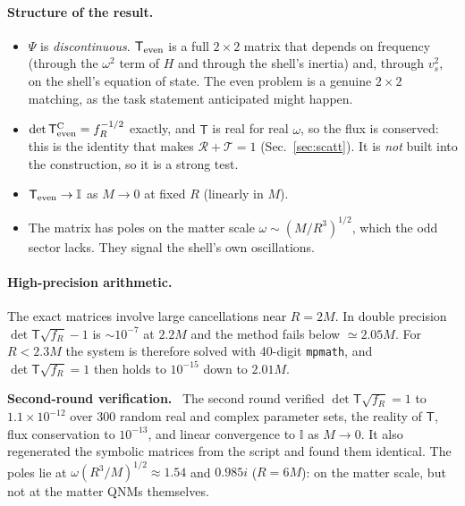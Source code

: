 \documentclass[11pt,a4paper]{article}
\numberwithin{equation}{section}
\newcommand{\sq}{\sqrt{f_R}}
\newcommand{\RR}{\mathcal R}
\newcommand{\TT}{\mathcal T}
\newenvironment{verifbox}{\par\medskip\begingroup\small\noindent{\color{orange!70!black}\rule{\linewidth}{0.8pt}}\par\nopagebreak\noindent\textbf{\color{orange!70!black}Second-round verification.}\ }%
  {\par\nopagebreak\noindent{\color{orange!70!black}\rule{\linewidth}{0.8pt}}\par\endgroup\medskip}
\begin{document}
\paragraph{Structure of the result.}
\begin{itemize}
\item $\Psi$ is \emph{discontinuous}. $\mathsf T_{\rm even}$ is a full $2\times2$ matrix that depends on frequency
(through the $\omega^2$ term of $H$ and through the shell's inertia) and, through $v_s^2$, on the shell's equation of
state. The even problem is a genuine $2\times2$ matching, as the task statement anticipated might happen.
\item $\det\mathsf T^{\rm C}_{\rm even}=f_R^{-1/2}$ exactly, and $\mathsf T$ is real for real $\omega$, so the flux is
conserved: this is the identity that makes $\RR+\TT=1$ (Sec.~\ref{sec:scatt}). It is \emph{not} built into the
construction, so it is a strong test.
\item $\mathsf T_{\rm even}\to\mathbb I$ as $M\to0$ at fixed $R$ (linearly in $M$).
\item The matrix has poles on the matter scale $\omega\sim(M/R^3)^{1/2}$, which the odd sector lacks. They signal
the shell's own oscillations.
\end{itemize}
\paragraph{High-precision arithmetic.} The exact matrices involve large cancellations near $R=2M$. In double
precision $\det\mathsf T\sq-1$ is $\sim10^{-7}$ at $2.2M$ and the method fails below $\simeq2.05M$. For $R<2.3M$ the
system is therefore solved with 40-digit \texttt{mpmath}, and $\det\mathsf T\sq=1$ then holds to $10^{-15}$ down to
$2.01M$.

\begin{verifbox}
The second round verified $\det\mathsf T\sq=1$ to $1.1\times10^{-12}$ over 300 random real and complex parameter
sets, the reality of $\mathsf T$, flux conservation to $10^{-13}$, and linear convergence to $\mathbb I$ as $M\to0$. It
also regenerated the symbolic matrices from the script and found them identical. The poles lie at
$\omega(R^3/M)^{1/2}\approx1.54$ and $0.985i$ ($R=6M$): on the matter scale, but not at the matter QNMs themselves.
\end{verifbox}
\end{document}
